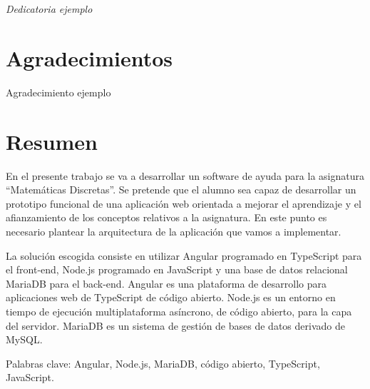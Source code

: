\documentclass[openright,twoside,10pt]{book}
\begin{document}
    \newpage
    \mbox{}	
    \thispagestyle{empty} %

    \chapter*{}

    \begin{flushright}
        \textit{%
        Dedicatoria ejemplo}
    \end{flushright}

    \chapter*{Agradecimientos} %

    Agradecimiento ejemplo

    \chapter*{Resumen} %
    \begin{flushleft}

    En el presente trabajo se va a desarrollar un software de ayuda para la
    asignatura ``Matemáticas Discretas''. Se pretende que el alumno sea
    capaz de desarrollar un prototipo funcional de una aplicación web
    orientada a mejorar el aprendizaje y el afianzamiento de los conceptos
    relativos a la asignatura. En este punto es necesario plantear la
    arquitectura de la aplicación que vamos a implementar.
    
    La solución escogida consiste en utilizar Angular programado en
    TypeScript para el front-end, Node.js programado en JavaScript y una
    base de datos relacional MariaDB para el back-end. Angular es una
    plataforma de desarrollo para aplicaciones web de TypeScript de código
    abierto. Node.js es un entorno en tiempo de ejecución multiplataforma
    asíncrono, de código abierto, para la capa del servidor. MariaDB es un
    sistema de gestión de bases de datos derivado de MySQL.
    
    Palabras clave: Angular, Node.js, MariaDB, código abierto, TypeScript,
    JavaScript.

    \end{flushleft}
\end{document}
